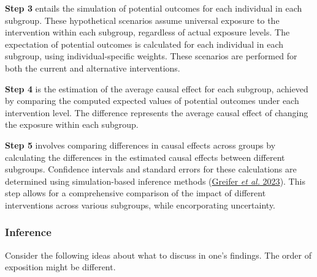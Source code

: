 \documentclass[
  singlecolumn]{article}
\begin{document}
\textbf{Step 3} entails the simulation of potential outcomes for each
individual in each subgroup. These hypothetical scenarios assume
universal exposure to the intervention within each subgroup, regardless
of actual exposure levels. The expectation of potential outcomes is
calculated for each individual in each subgroup, using
individual-specific weights. These scenarios are performed for both the
current and alternative interventions.

\textbf{Step 4} is the estimation of the average causal effect for each
subgroup, achieved by comparing the computed expected values of
potential outcomes under each intervention level. The difference
represents the average causal effect of changing the exposure within
each subgroup.

\textbf{Step 5} involves comparing differences in causal effects across
groups by calculating the differences in the estimated causal effects
between different subgroups. Confidence intervals and standard errors
for these calculations are determined using simulation-based inference
methods (\hyperref[ref-greifer2023]{Greifer \emph{et al.} 2023}). This
step allows for a comprehensive comparison of the impact of different
interventions across various subgroups, while encorporating uncertainty.

\subsubsection{Inference}\label{inference}

Consider the following ideas about what to discuss in one's findings.
The order of exposition might be different.
\end{document}
